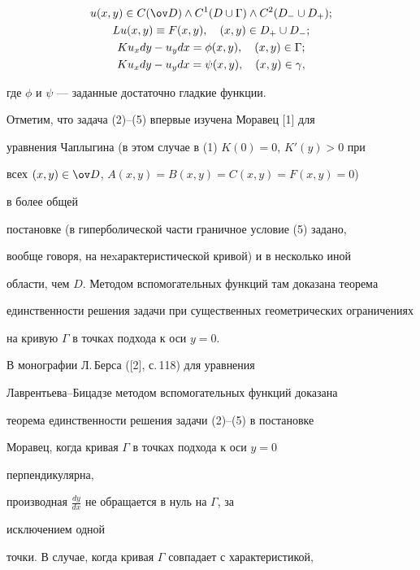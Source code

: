 \begin{gather} 


u(x,y)\in C(\ov D)\wedge C^1(D\cup\Gamma)\wedge C^2(D_-\cup D_+);\\ 


L u(x,y)\equiv F(x,y),\quad (x,y)\in D_+\cup D_-; \\ 


K u_x dy-u_y dx=\phi(x,y),\quad (x,y)\in\Gamma; \\ 


K u_x dy-u_y dx=\psi(x,y),\quad (x,y)\in\gamma, 


\end{gather} 


где $\phi$ и $\psi$ --- заданные достаточно гладкие функции. 


\medskip 


 


Отметим, что задача (2)--(5) впервые изучена Моравец [1] для 


уравнения Чаплыгина (в этом случае в (1) $K(0)=0$, $K'(y)>0$ при 


всех $(x,y)\in\ov D$, $A(x,y)=B(x,y)=C(x,y)=F(x,y)=0$) 


в более общей 


постановке (в гиперболической части граничное условие (5) задано, 


вообще говоря, на неxарактеристической кривой) и в несколько иной 


области, чем $D$. Методом вспомогательных функций там доказана теорема 


единственности решения задачи при существенных геометрических ограничениях 


на кривую $\Gamma$ в точках подхода к оси $y=0$. 


В монографии Л.\,Берса ([2], с.\,118) для уравнения 


Лаврентьева--Бицадзе методом вспомогательных функций доказана 


теорема единственности решения задачи (2)--(5) в постановке 


Моравец, когда кривая $\Gamma$ в точках подхода к оси $y=0$ 


перпендикулярна, 


производная $\frac{dy}{dx}$ не обращается в нуль на $\Gamma$, за 


исключением одной 


точки. В случае, когда кривая $\Gamma$ совпадает с характеристикой, 


